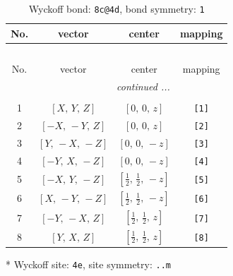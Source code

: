 \documentclass[fleqn,8pt]{jsarticle}
\begin{document}
\renewcommand{\arraystretch}{1.2}
\begin{longtable}{cccc}
\caption{Wyckoff bond: {\tt 8c@4d}, bond symmetry: {\tt 1}}
 \\
 \hline \hline
No. & vector & center & mapping \\ \hline \endfirsthead

\multicolumn{3}{l}{\tablename\ \thetable{}} \\
 \hline \hline
No. & vector & center & mapping \\ \hline \endhead

 \hline \hline
\multicolumn{3}{r}{\footnotesize\it continued ...} \\ \endfoot

 \hline \hline
\multicolumn{3}{r}{} \\ \endlastfoot

1 & $\left[ X,\, Y,\, Z \right]$ & $\left[ 0,\, 0,\, z \right]$ & {\tt [1]} \\ \hline
2 & $\left[ - X,\, - Y,\, Z \right]$ & $\left[ 0,\, 0,\, z \right]$ & {\tt [2]} \\ \hline
3 & $\left[ Y,\, - X,\, - Z \right]$ & $\left[ 0,\, 0,\, - z \right]$ & {\tt [3]} \\ \hline
4 & $\left[ - Y,\, X,\, - Z \right]$ & $\left[ 0,\, 0,\, - z \right]$ & {\tt [4]} \\ \hline
5 & $\left[ - X,\, Y,\, - Z \right]$ & $\left[ \frac{1}{2},\, \frac{1}{2},\, - z \right]$ & {\tt [5]} \\ \hline
6 & $\left[ X,\, - Y,\, - Z \right]$ & $\left[ \frac{1}{2},\, \frac{1}{2},\, - z \right]$ & {\tt [6]} \\ \hline
7 & $\left[ - Y,\, - X,\, Z \right]$ & $\left[ \frac{1}{2},\, \frac{1}{2},\, z \right]$ & {\tt [7]} \\ \hline
8 & $\left[ Y,\, X,\, Z \right]$ & $\left[ \frac{1}{2},\, \frac{1}{2},\, z \right]$ & {\tt [8]} \\
\end{longtable}
* Wyckoff site: {\tt 4e}, site symmetry: {\tt ..m}
\renewcommand{\arraystretch}{1.2}
\end{document}
